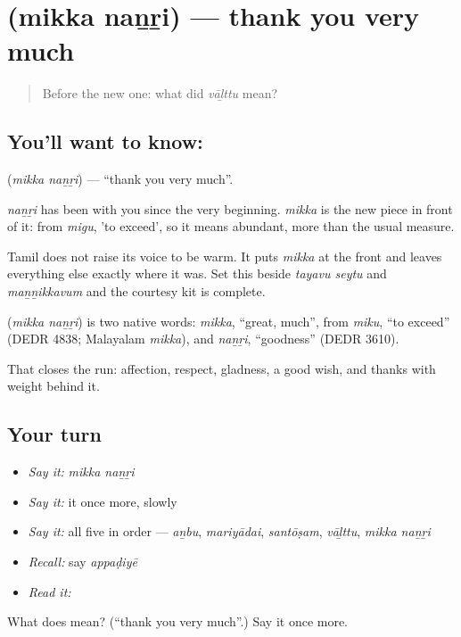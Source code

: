 \section[\texorpdfstring{\ta{மிக்க} \ta{நன்றி} (mikka naṉṟi)}{மிக்க நன்றி (mikka naṉṟi)}]{  (mikka naṉṟi) — thank you very much}

\label{lesson:TA-C49-many-thanks}



\begin{quote}
Before the new one: what did \emph{vāḻttu} mean?
\end{quote}

\subsection*{You'll want to know:  }
\textbf{ } (\emph{mikka naṉṟi}) — \textquotedblleft{}thank you very much\textquotedblright{}.

\emph{naṉṟi} has been with you since the very beginning. \emph{mikka} is the new piece in front of it: from \emph{migu}, 'to exceed', so it means abundant, more than the usual measure.

Tamil does not raise its voice to be warm. It puts \emph{mikka} at the front and leaves everything else exactly where it was. Set this beside \emph{tayavu seytu} and \emph{maṉṉikkavum} and the courtesy kit is complete.

\begin{cousinweb}
\textbf{ } (\emph{mikka naṉṟi}) is two native words: \emph{mikka}, \textquotedblleft{}great, much\textquotedblright{}, from \emph{miku}, \textquotedblleft{}to exceed\textquotedblright{} (DEDR 4838; Malayalam \emph{mikka}), and \emph{naṉṟi}, \textquotedblleft{}goodness\textquotedblright{} (DEDR 3610).
\end{cousinweb}

\begin{grammarlens}[title={What you've built}]
That closes the run: affection, respect, gladness, a good wish, and thanks with weight behind it.
\end{grammarlens}

\subsection*{Your turn}
\begin{itemize}
\raggedright
  \item \emph{Say it:} \emph{mikka naṉṟi}
  \item \emph{Say it:} it once more, slowly
  \item \emph{Say it:} all five in order — \emph{aṉbu}, \emph{mariyādai}, \emph{santōṣam}, \emph{vāḻttu}, \emph{mikka naṉṟi}
  \item \emph{Recall:} say \emph{appaḍiyē}
  \item \emph{Read it:} \textbf{}
\end{itemize}

\begin{tcolorbox}[breakable,colback=teal!4,colframe=teal!35!black,title={Before you move on}]
What does   mean? (\textquotedblleft{}thank you very much\textquotedblright{}.) Say it once more.
\end{tcolorbox}
